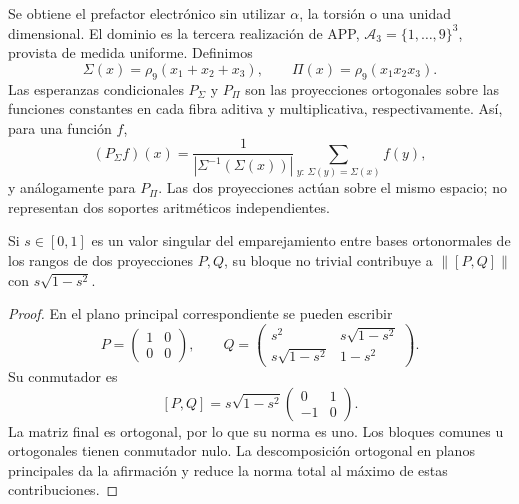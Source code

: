 Se obtiene el prefactor electrónico sin utilizar \(\alpha\), la torsión
o una unidad dimensional. El dominio es la tercera realización de APP,
\(\mathcal A_3=\{1,\ldots,9\}^3\), provista de medida uniforme.
Definimos
\[
 \Sigma(x)=\rho_9(x_1+x_2+x_3),\qquad
 \Pi(x)=\rho_9(x_1x_2x_3).
\]
Las esperanzas condicionales \(P_\Sigma\) y \(P_\Pi\) son las
proyecciones ortogonales sobre las funciones constantes en cada fibra
aditiva y multiplicativa, respectivamente. Así, para una función \(f\),
\[
 (P_\Sigma f)(x)
 =\frac{1}{|\Sigma^{-1}(\Sigma(x))|}
   \sum_{y:\,\Sigma(y)=\Sigma(x)}f(y),
\]
y análogamente para \(P_\Pi\). Las dos proyecciones actúan sobre el
mismo espacio; no representan dos soportes aritméticos independientes.

\begin{lemma}
Si \(s\in[0,1]\) es un valor singular del emparejamiento entre bases
ortonormales de los rangos de dos proyecciones \(P,Q\), su bloque no
trivial contribuye a \(\|[P,Q]\|\) con
\(s\sqrt{1-s^2}\).
\end{lemma}
\begin{proof}
En el plano principal correspondiente se pueden escribir
\[
 P=\begin{pmatrix}1&0\\0&0\end{pmatrix},\qquad
 Q=\begin{pmatrix}
 s^2&s\sqrt{1-s^2}\\
 s\sqrt{1-s^2}&1-s^2
 \end{pmatrix}.
\]
Su conmutador es
\[
 [P,Q]=s\sqrt{1-s^2}
 \begin{pmatrix}0&1\\-1&0\end{pmatrix}.
\]
La matriz final es ortogonal, por lo que su norma es uno. Los bloques
comunes u ortogonales tienen conmutador nulo. La descomposición ortogonal
en planos principales da la afirmación y reduce la norma total al máximo
de estas contribuciones.
\end{proof}

